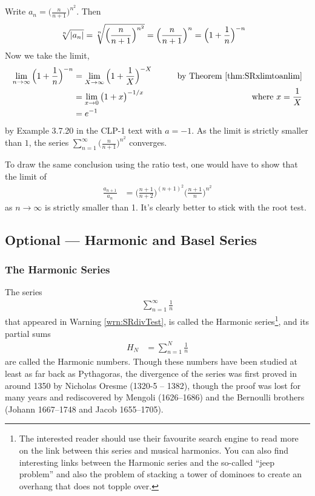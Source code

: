 \begin{eg}[ $\sum_{n=1}^\infty \big(\frac{n}{n+1}\big)^{n^2}$ ]
\label{eg:rootB}
Write $a_n=  \big(\frac{n}{n+1}\big)^{n^2}$. Then
\begin{align*}
\root{n}\of{|a_n|}
  &= \root{n}\of{ \Big(\frac{n}{n+1}\Big)^{n^2}}
   = \Big(\frac{n}{n+1}\Big)^{n}
   = \Big(1+\frac{1}{n}\Big)^{-n}
\end{align*}
Now we take the limit,
\begin{align*}
\lim_{n\to\infty}\Big(1+\frac{1}{n}\Big)^{-n}
&=\lim_{X\to\infty}\Big(1+\frac{1}{X}\Big)^{-X}
\qquad&\text{by Theorem \ref{thm:SRxlimtoanlim}}  \\
&=\lim_{x\to 0}\big(1+x\big)^{-1/x}
\qquad&\text{where $x=\frac{1}{X}$} \\
&= e^{-1}
\end{align*}
by Example 3.7.20 in the CLP-1 text with $a=-1$.
As the limit is strictly smaller than $1$, the series
$\sum_{n=1}^\infty \big(\frac{n}{n+1}\big)^{n^2}$
converges.

To draw the same conclusion using the ratio test, one would have to show that
the limit of
\begin{align*}
\frac{a_{n+1}}{a_n}
&= \Big(\frac{n+1}{n+2}\Big)^{(n+1)^2}  \Big(\frac{n+1}{n}\Big)^{n^2}
\end{align*}
as $n\rightarrow\infty$ is strictly smaller than 1. It's clearly
better to stick with the root test.
\end{eg}

\subsection{Optional --- Harmonic and Basel Series}
           \label{sec:HarminicBasel}
\subsubsection*{The Harmonic Series}
The series
\begin{align*}
  \sum_{n=1}^\infty \frac{1}{n}
\end{align*}
that appeared in Warning \ref{wrn:SRdivTest}, is called the Harmonic
series\footnote{The interested reader should use their favourite
search engine to read more on the link between this series and musical harmonics. You can also find interesting links between the Harmonic series
and the so-called ``jeep problem'' and also the problem of stacking a
tower of dominoes to create an overhang that does not topple over.},
and its partial sums
\begin{align*}
H_N &= \sum_{n=1}^N \frac{1}{n}
\end{align*}
are called the Harmonic numbers. Though these numbers have been studied
at least as far back as Pythagoras, the divergence of the series was
first proved in around 1350 by Nicholas Oresme (1320-5 -- 1382), though the
proof was lost for many years and rediscovered by Mengoli (1626--1686)
and the Bernoulli brothers (Johann 1667--1748 and Jacob 1655--1705).


